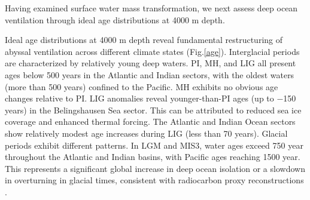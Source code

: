 \documentclass[draft]{agujournal2025}
\begin{document}

Having examined surface water mass transformation, we next assess deep ocean ventilation through ideal age distributions at 4000 m depth.


Ideal age distributions at 4000 m depth reveal fundamental restructuring of abyssal ventilation across different climate states (Fig.\ref{age}). Interglacial periods are characterized by relatively young deep waters. PI, MH, and LIG all present ages below 500 years in the Atlantic and Indian sectors, with the oldest waters (more than 500 years) confined to the Pacific.  MH exhibits no obvious age changes relative to PI. LIG anomalies reveal younger-than-PI ages (up to $-$150 years) in the Belingshausen Sea sector. This can be attributed to reduced sea ice coverage and enhanced thermal forcing. The Atlantic and Indian Ocean sectors show relatively modest age increases during LIG (less than 70 years). Glacial periods exhibit different patterns. In LGM and MIS3, water ages exceed 750 year throughout the Atlantic and Indian basins, with Pacific ages reaching 1500 year. This represents a significant global increase in deep ocean isolation or a slowdown in overturning in glacial times, consistent with radiocarbon proxy reconstructions \cite{Skinner2017}.


\end{document}
